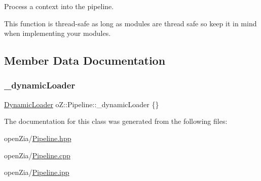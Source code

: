 Process a context into the pipeline. 

This function is thread-\/safe as long as modules are thread safe so keep it in mind when implementing your modules. 

\subsection{Member Data Documentation}
\mbox{\label{classo_z_1_1_pipeline_a6412859211177d78f0eebcecda79e841}} 
\subsubsection{\texorpdfstring{\_dynamicLoader}{\_dynamicLoader}}
{\footnotesize\ttfamily \mbox{\hyperlink{classo_z_1_1_dynamic_loader}{Dynamic\+Loader}} o\+Z\+::\+Pipeline\+::\+\_\+dynamic\+Loader \{\}\hspace{0.3cm}{\ttfamily [protected]}}



The documentation for this class was generated from the following files\+:\begin{DoxyCompactItemize}
\item 
open\+Zia/\mbox{\hyperlink{_pipeline_8hpp}{Pipeline.\+hpp}}\item 
open\+Zia/\mbox{\hyperlink{_pipeline_8cpp}{Pipeline.\+cpp}}\item 
open\+Zia/\mbox{\hyperlink{_pipeline_8ipp}{Pipeline.\+ipp}}\end{DoxyCompactItemize}
